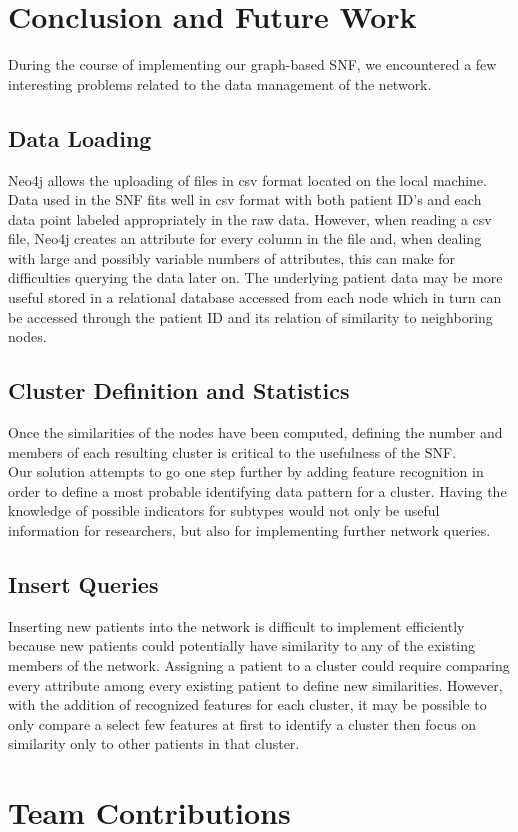 \documentclass[12pt]{article}
\begin{document}
\section*{Conclusion and Future Work}
\quad During the course of implementing our graph-based SNF, we encountered a few interesting problems related to the data management of the network.
\subsection*{Data Loading}
\quad Neo4j allows the uploading of files in csv format located on the local machine. Data used in the SNF fits well in csv format with both patient ID's and each data point labeled appropriately in the raw data. However, when reading a csv file, Neo4j creates an attribute for every column in the file and, when dealing with large and possibly variable numbers of attributes, this can make for difficulties querying the data later on. The underlying patient data may be more useful stored in a relational database accessed from each node which in turn can be accessed through the patient ID and its relation of similarity to neighboring nodes.
\subsection*{Cluster Definition and Statistics}
\quad Once the similarities of the nodes have been computed, defining the number and members of each resulting cluster is critical to the usefulness of the SNF. \\
\quad Our solution attempts to go one step further by adding feature recognition in order to define a most probable identifying data pattern for a cluster. Having the knowledge of possible indicators for subtypes would not only be useful information for researchers, but also for implementing further network queries.
\subsection*{Insert Queries}
\quad Inserting new patients into the network is difficult to implement efficiently because new patients could potentially have similarity to any of the existing members of the network. Assigning a patient to a cluster could require comparing every attribute among every existing patient to define new similarities. However, with the addition of recognized features for each cluster, it may be possible to only compare a select few features at first to identify a cluster then focus on similarity only to other patients in that cluster. 
\section*{Team Contributions}


\end{document}
